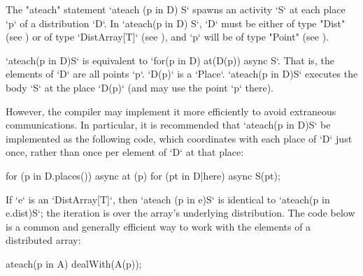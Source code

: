 The \xcd"ateach" statement \xcd`ateach (p in D) S`
spawns an activity \xcd`S` at each place \xcd`p` of a distribution \xcd`D`. 
In \xcd`ateach(p in D) S`, 
\xcd`D` must be either of type \xcd"Dist" 
(see )
or of type
\xcd`DistArray[T]` (see ), 
and \xcd`p` will be of type \xcd"Point" (see ).

\xcd`ateach(p in D)S` is equivalent to 
\xcd`for(p in D) at(D(p)) async S`.  That is, the elements of \xcd`D` are all
points \xcd`p`.  \xcd`D(p)` is a \xcd`Place`.  \xcd`ateach(p in D)S` executes
the body \xcd`S` at the place \xcd`D(p)` (and may use the point \xcd`p`
there). 


However, the compiler may implement it more efficiently to avoid extraneous
communications.  In particular, it is recommended that \xcd`ateach(p in D)S`
be implemented as the following code, which coordinates with each place of
\xcd`D` just once, rather than once per element of \xcd`D` at that place: 

\begin{xten}
for (p in D.places()) async at (p) {
    for (pt in D|here) async {
        S(pt);
    }
}
\end{xten}

If \xcd`e` is an \xcd`DistArray[T]`, then \xcd`ateach (p in e)S` is identical to
\xcd`ateach(p in e.dist)S`; the iteration is over the array's underlying
distribution.   
The code below is a common and generally efficient way to work with the
elements of a distributed array:
\begin{xten}
ateach(p in A) 
  dealWith(A(p));
\end{xten}








